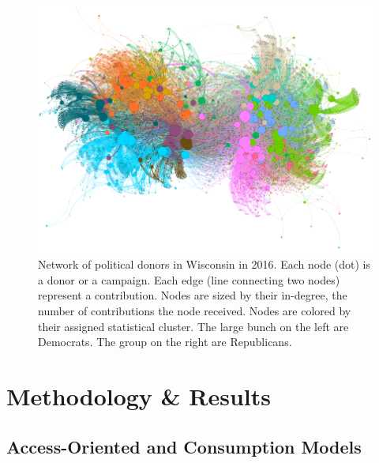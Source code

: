 \documentclass[12pt,]{article}
\begin{document}
\begin{figure}
\centering
\includegraphics{../tables_and_figures/fig_1_white.png}
\caption{Network of political donors in Wisconsin in 2016. Each node
(dot) is a donor or a campaign. Each edge (line connecting two nodes)
represent a contribution. Nodes are sized by their in-degree, the number
of contributions the node received. Nodes are colored by their assigned
statistical cluster. The large bunch on the left are Democrats. The
group on the right are Republicans.}
\end{figure}

\hypertarget{methodology-results}{%
\section{Methodology \& Results}\label{methodology-results}}

\hypertarget{access-oriented-and-consumption-models}{%
\subsection{Access-Oriented and Consumption
Models}\label{access-oriented-and-consumption-models}}
\end{document}

